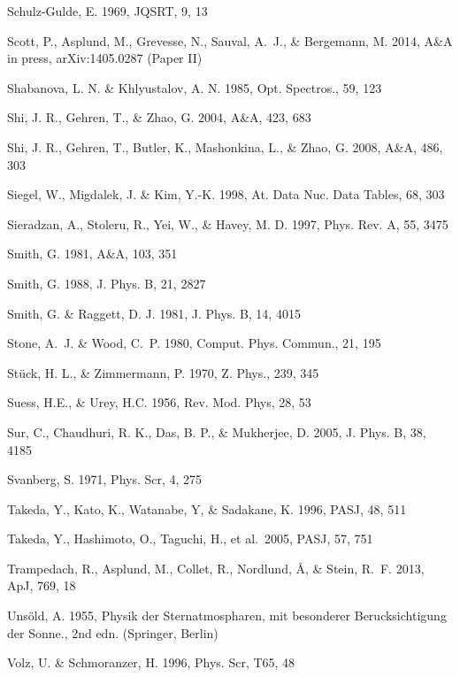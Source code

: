 \documentclass[traditabstract]{aa}
\begin{document}
\begin{thebibliography}{}
  Schulz-Gulde, E. 1969, JQSRT, 9, 13

  Scott, P., Asplund, M., Grevesse, N., Sauval, A.~J., \& Bergemann, M. 2014, A\&A in press, arXiv:1405.0287 (Paper II)

  Shabanova, L. N. \& Khlyustalov, A. N. 1985, Opt. Spectros., 59, 123

  Shi, J. R., Gehren, T., \& Zhao, G. 2004, A\&A, 423, 683

  Shi, J. R., Gehren, T., Butler, K., Mashonkina, L., \& Zhao, G. 2008, A\&A, 486, 303

  Siegel, W., Migdalek, J. \& Kim, Y.-K.  1998, At. Data Nuc. Data Tables, 68, 303

  Sieradzan, A., Stoleru, R., Yei, W., \& Havey, M. D. 1997, Phys. Rev. A, 55, 3475

  Smith, G. 1981, A\&A, 103, 351

  Smith, G. 1988, J. Phys. B, 21, 2827

  Smith, G. \& Raggett, D. J. 1981, J. Phys. B, 14, 4015
 
   {Stone}, A.~J. \& {Wood}, C.~P. 1980, Comput. Phys. Commun., 21, 195

  St\"{u}ck, H. L., \& Zimmermann, P. 1970, Z. Phys., 239, 345

  Suess, H.E., \& Urey, H.C. 1956, Rev. Mod. Phys, 28, 53

  Sur, C., Chaudhuri, R. K., Das, B. P., \& Mukherjee, D. 2005, J. Phys. B, 38, 4185

  Svanberg, S. 1971, Phys. Scr, 4, 275

  Takeda, Y., Kato, K., Watanabe, Y, \& Sadakane, K. 1996, PASJ, 48, 511

  Takeda, Y., Hashimoto, O., Taguchi, H., et al.\ 2005, PASJ, 57, 751

  Trampedach, R., Asplund, M., Collet, R., Nordlund, {\AA}, \& Stein, R.~F. 2013, ApJ, 769, 18

  Uns\"old, A. 1955, {Physik der Sternatmospharen, mit besonderer Berucksichtigung der Sonne.}, 2nd edn. (Springer, Berlin)

  Volz, U. \& Schmoranzer, H. 1996, Phys. Scr, T65, 48


\end{thebibliography}
\end{document}
